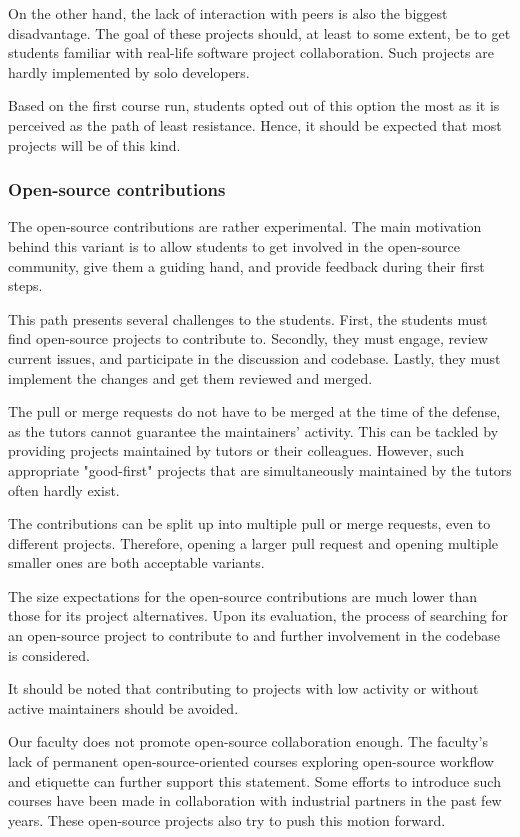 \documentclass[
  digital,
  color,
  oneside,
  nosansbold,
  nocolorbold,
  lof,
  nolot,
]{fithesis4}
\begin{document}
On the other hand, the lack of interaction with peers is also the biggest disadvantage. The goal of these projects should, at least to some extent, be to get students familiar with real-life software project collaboration. Such projects are hardly implemented by solo developers.

Based on the first course run, students opted out of this option the most as it is perceived as the path of least resistance. Hence, it should be expected that most projects will be of this kind.

\subsubsection{Open-source contributions}

The open-source contributions are rather experimental. The main motivation behind this variant is to allow students to get involved in the open-source community, give them a guiding hand, and provide feedback during their first steps. 

This path presents several challenges to the students. First, the students must find open-source projects to contribute to. Secondly, they must engage, review current issues, and participate in the discussion and codebase. Lastly, they must implement the changes and get them reviewed and merged.

The pull or merge requests do not have to be merged at the time of the defense, as the tutors cannot guarantee the maintainers' activity. This can be tackled by providing projects maintained by tutors or their colleagues. However, such appropriate "good-first" projects that are simultaneously maintained by the tutors often hardly exist.

The contributions can be split up into multiple pull or merge requests, even to different projects. Therefore, opening a larger pull request and opening multiple smaller ones are both acceptable variants.

The size expectations for the open-source contributions are much lower than those for its project alternatives. Upon its evaluation, the process of searching for an open-source project to contribute to and further involvement in the codebase is considered.

It should be noted that contributing to projects with low activity or without active maintainers should be avoided.

Our faculty does not promote open-source collaboration enough. The faculty's lack of permanent open-source-oriented courses exploring open-source workflow and etiquette can further support this statement. Some efforts to introduce such courses have been made in collaboration with industrial partners in the past few years. These open-source projects also try to push this motion forward.
\end{document}
